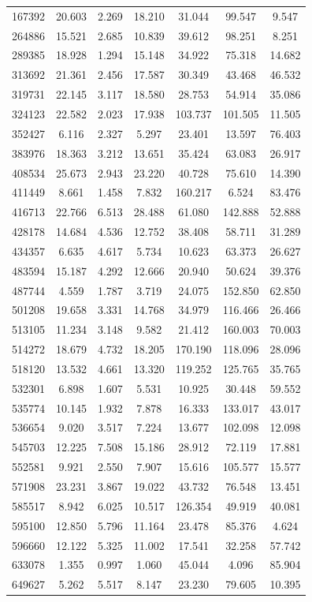 \documentclass[fleqn,usenatbib]{mnras}
\begin{document}
\begin{table}
\begin{tabular}{S[table-format=6]S[table-format=2.3]S[table-format=1.3]S[table-format=2.3]S[table-format=3.3]S[table-format=3.3]S[table-format=2.3]}
167392 & 20.603 & 2.269 & 18.210 & 31.044 & 99.547 & 9.547 \\
264886 & 15.521 & 2.685 & 10.839 & 39.612 & 98.251 & 8.251 \\
289385 & 18.928 & 1.294 & 15.148 & 34.922 & 75.318 & 14.682 \\
313692 & 21.361 & 2.456 & 17.587 & 30.349 & 43.468 & 46.532 \\
319731 & 22.145 & 3.117 & 18.580 & 28.753 & 54.914 & 35.086 \\
324123 & 22.582 & 2.023 & 17.938 & 103.737 & 101.505 & 11.505 \\
352427 & 6.116 & 2.327 & 5.297 & 23.401 & 13.597 & 76.403 \\
383976 & 18.363 & 3.212 & 13.651 & 35.424 & 63.083 & 26.917 \\
408534 & 25.673 & 2.943 & 23.220 & 40.728 & 75.610 & 14.390 \\
411449 & 8.661 & 1.458 & 7.832 & 160.217 & 6.524 & 83.476 \\
416713 & 22.766 & 6.513 & 28.488 & 61.080 & 142.888 & 52.888 \\
428178 & 14.684 & 4.536 & 12.752 & 38.408 & 58.711 & 31.289 \\
434357 & 6.635 & 4.617 & 5.734 & 10.623 & 63.373 & 26.627 \\
483594 & 15.187 & 4.292 & 12.666 & 20.940 & 50.624 & 39.376 \\
487744 & 4.559 & 1.787 & 3.719 & 24.075 & 152.850 & 62.850 \\
501208 & 19.658 & 3.331 & 14.768 & 34.979 & 116.466 & 26.466 \\
513105 & 11.234 & 3.148 & 9.582 & 21.412 & 160.003 & 70.003 \\
514272 & 18.679 & 4.732 & 18.205 & 170.190 & 118.096 & 28.096 \\
518120 & 13.532 & 4.661 & 13.320 & 119.252 & 125.765 & 35.765 \\
532301 & 6.898 & 1.607 & 5.531 & 10.925 & 30.448 & 59.552 \\
535774 & 10.145 & 1.932 & 7.878 & 16.333 & 133.017 & 43.017 \\
536654 & 9.020 & 3.517 & 7.224 & 13.677 & 102.098 & 12.098 \\
545703 & 12.225 & 7.508 & 15.186 & 28.912 & 72.119 & 17.881 \\
552581 & 9.921 & 2.550 & 7.907 & 15.616 & 105.577 & 15.577 \\
571908 & 23.231 & 3.867 & 19.022 & 43.732 & 76.548 & 13.451 \\
585517 & 8.942 & 6.025 & 10.517 & 126.354 & 49.919 & 40.081 \\
595100 & 12.850 & 5.796 & 11.164 & 23.478 & 85.376 & 4.624 \\
596660 & 12.122 & 5.325 & 11.002 & 17.541 & 32.258 & 57.742 \\
633078 & 1.355 & 0.997 & 1.060 & 45.044 & 4.096 & 85.904 \\
649627 & 5.262 & 5.517 & 8.147 & 23.230 & 79.605 & 10.395 \\
\hline
\end{tabular}
\end{table}
\end{document}
